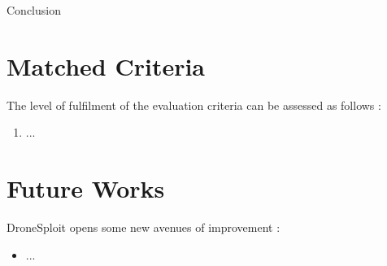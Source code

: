 \begin{chaptercover}{Conclusion}
\section{Matched Criteria}
The level of fulfilment of the evaluation criteria can be assessed as follows :
{\hyphenation{}
\begin{enumerate}[itemsep=0.02cm,topsep=0.02cm]
  \item {\color{red} ...}
\end{enumerate}}

\section{Future Works} \label{sec:future-works}
DroneSploit opens some new avenues of improvement :
{\hyphenation{}
\begin{itemize}[itemsep=0.02cm,topsep=0.02cm]
  \item {\color{red} ...}
\end{itemize}}

\end{chaptercover}

